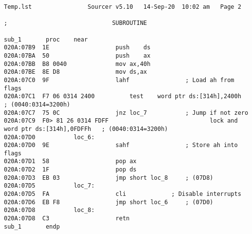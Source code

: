 \begin{lstlisting}[label=some-code,caption=Код прераывания INT 8h]
Temp.lst				Sourcer	v5.10   14-Sep-20  10:02 am   Page 2

;                              SUBROUTINE

sub_1		proc	near
020A:07B9  1E					push	ds
020A:07BA  50					push	ax
020A:07BB  B8 0040				mov	ax,40h
020A:07BE  8E D8				mov	ds,ax
020A:07C0  9F					lahf				; Load ah from flags
020A:07C1  F7 06 0314 2400			test	word ptr ds:[314h],2400h	; (0040:0314=3200h)
020A:07C7  75 0C				jnz	loc_7			; Jump if not zero
020A:07C9  F0> 81 26 0314 FDFF	                           lock	and	word ptr ds:[314h],0FDFFh	; (0040:0314=3200h)
020A:07D0			loc_6:
020A:07D0  9E					sahf				; Store ah into flags
020A:07D1  58					pop	ax
020A:07D2  1F					pop	ds
020A:07D3  EB 03				jmp	short loc_8		; (07D8)
020A:07D5			loc_7:
020A:07D5  FA					cli				; Disable interrupts
020A:07D6  EB F8				jmp	short loc_6		; (07D0)
020A:07D8			loc_8:
020A:07D8  C3					retn
sub_1		endp
\end{lstlisting}



